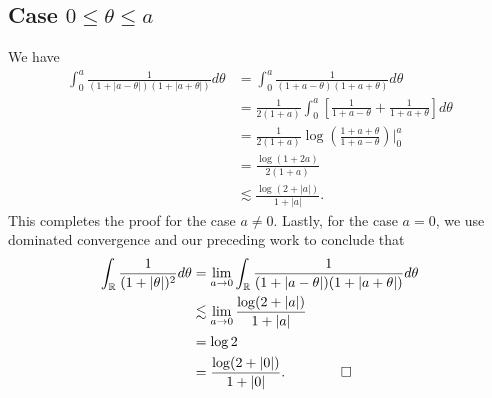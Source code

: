 \documentclass[12pt,reqno]{amsart}
\numberwithin{equation}{section}  %
\numberwithin{figure}{section}
\newcommand{\rr}{\mathbb{R}}
\theoremstyle{plain}
\theoremstyle{definition}
\theoremstyle{remark}
\begin{document}
\subsection{Case $0 \le \theta \le a$}
We have
%
%
\begin{equation*}
	\begin{split}
		\int_{0}^{a} \frac{1}{(1 + | a - \theta |)(1 + | a + \theta |)}d \theta
		& = \int_{0}^{a} \frac{1}{(1 +  a - \theta )(1 +  a + \theta )}d \theta
		\\
		& = \frac{1}{2(1 + a)} \int_{0}^{a} \left[ \frac{1}{1 + a - \theta} +
		\frac{1}{1 + a + \theta} \right]d \theta
		\\
		& = \frac{1}{2(1 + a)} \log \left( \frac{1 + a + \theta}{1 + a - \theta}
		\right) \Big |_{0}^{a}
		\\
		& = \frac{\log\left( 1 + 2a \right)}{2\left( 1 + a \right)}
		\\
		& \lesssim \frac{\log(2 + | a |)}{1 + | a |}.
	\end{split}
\end{equation*}
%
%
This completes the proof for the case $a \neq 0$. Lastly, for the case
$a =0$, we use dominated convergence and our preceding work to
conclude that
%
%
\begin{equation*}
	\begin{split}
		\int_{\rr} \frac{1}{(1 + | \theta|)^2} d \theta
		& = \lim_{a \to 0}
		\int_{\rr} \frac{1}{(1 + | a - \theta |)(1 + | a + \theta |)}d \theta
		\\
		& \lesssim \lim_{a \to 0} \frac{\log(2 + | a |)}{1 + | a |}
		\\
		& =  \log 2
		\\
		& = \frac{\log(2 + | 0 |)}{1 + | 0 |}. \qquad \qed
	\end{split}
\end{equation*}
\end{document}
